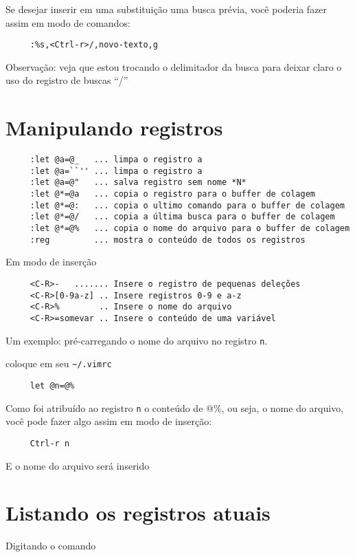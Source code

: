 Se desejar inserir em uma substituição uma busca prévia, você poderia
fazer assim em modo de comandos:

\begin{verbatim}
     :%s,<Ctrl-r>/,novo-texto,g
\end{verbatim}

Observação: veja que estou trocando o delimitador da busca para deixar
claro o uso do registro de buscas ``/''

\section{Manipulando registros}
\label{Manipulando registros}

\begin{verbatim}
     :let @a=@_   ... limpa o registro a
     :let @a=``'' ... limpa o registro a
     :let @a=@"   ... salva registro sem nome *N*
     :let @*=@a   ... copia o registro para o buffer de colagem
     :let @*=@:   ... copia o ultimo comando para o buffer de colagem
     :let @*=@/   ... copia a última busca para o buffer de colagem
     :let @*=@%   ... copia o nome do arquivo para o buffer de colagem
     :reg         ... mostra o conteúdo de todos os registros
\end{verbatim}

Em modo de inserção

\begin{verbatim}
     <C-R>-   ....... Insere o registro de pequenas deleções
     <C-R>[0-9a-z] .. Insere registros 0-9 e a-z
     <C-R>%        .. Insere o nome do arquivo
     <C-R>=somevar .. Insere o conteúdo de uma variável
\end{verbatim}


Um exemplo: pré-carregando o nome do arquivo no registro \verb+n+.

coloque em seu \verb+~/.vimrc+

\begin{verbatim}
     let @n=@%
\end{verbatim}

Como foi atribuído ao registro \verb+n+ o conteúdo de @\%, ou seja, o nome
do arquivo, você pode fazer algo assim em modo de inserção:

\begin{verbatim}
     Ctrl-r n
\end{verbatim}

E o nome do arquivo será inserido

\section{Listando os registros atuais}
\label{Listando os registros atuais}
Digitando o comando

